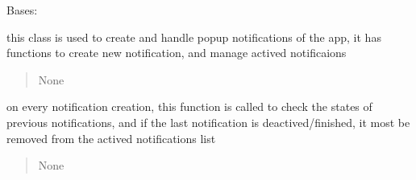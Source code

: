 \documentclass[letterpaper,10pt,english]{sphinxmanual}
\begin{document}

\begin{savenotes}\begin{fulllineitems}
\label{\detokenize{setting/notif_UI:oxin.notif_UI.notification_manager}}
\pysigstartsignatures
{}
\pysigstopsignatures
\sphinxAtStartPar
Bases: 

\sphinxAtStartPar
this class is used to create and handle pop\sphinxhyphen{}up notifications of the app, it has functions to create new notification,
and manage actived notificaions
\begin{quote}\begin{description}
\sphinxAtStartPar
None

\end{description}\end{quote}

\begin{savenotes}\begin{fulllineitems}
\label{\detokenize{setting/notif_UI:oxin.notif_UI.notification_manager.check_active_notifs}}
\pysigstartsignatures
{}
\pysigstopsignatures
\sphinxAtStartPar
on every notification creation, this function is called to check the states of previous notifications, and if the last notification is
deactived/finished, it most be removed from the actived notifications list
\begin{quote}\begin{description}
\sphinxAtStartPar
None

\end{description}\end{quote}

\end{fulllineitems}\end{savenotes}



\end{fulllineitems}
\end{savenotes}
\end{document}
